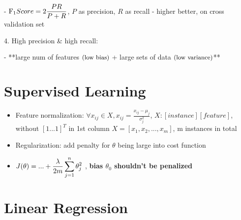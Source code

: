 - $\displaystyle \text{F}_1 \space  Score = 2\frac{PR}{P+R}$, $P$ as precision, $R$ as recall
- higher better, on cross validation set

4. High precision \& high recall:

- **large num of features $\small\text{(low bias)}$ + large sets of data $\small\text{(low variance)}$**


\section{Supervised Learning}
\begin{itemize}

\item Feature normalization: $\forall x_{ij} \in X, x_{ij}=\frac{x_{ij}-\mu_j}{\sigma_j^2}$, $ X:[instance][feature]$, without $[1...1]^T$ in 1st column $X=[x_1,x_2,...,x_m]$, m instances in total
\item Regularization: add penalty for $\theta$ being large into cost function
\item $\displaystyle J(\theta)= \space... + \frac{\lambda}{2m}\sum^n_{j=1}\theta_j^2$ , \textbf{bias $\theta_0$ shouldn't be penalized} 

\end{itemize}

\section{Linear Regression}

